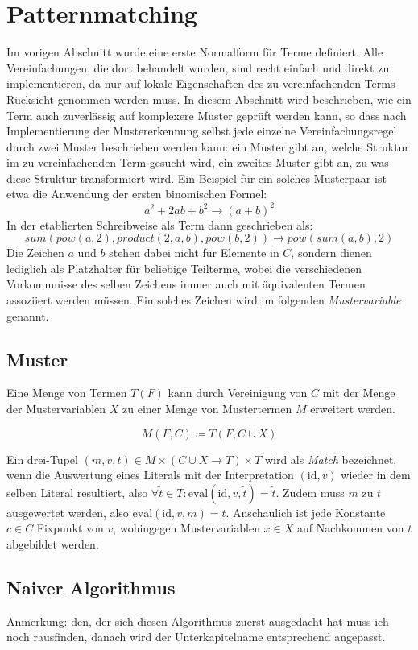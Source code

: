 \documentclass{article}
\begin{document}
\section{Patternmatching}
Im vorigen Abschnitt wurde eine erste Normalform für Terme definiert. Alle Vereinfachungen, die dort behandelt wurden, sind recht einfach und direkt zu implementieren, da nur auf lokale Eigenschaften des zu vereinfachenden Terms Rücksicht genommen werden muss. In diesem Abschnitt wird beschrieben, wie ein Term auch zuverlässig auf komplexere Muster geprüft werden kann, so dass nach Implementierung der Mustererkennung selbst jede einzelne Vereinfachungsregel durch zwei Muster beschrieben werden kann: ein Muster gibt an, welche Struktur im zu vereinfachenden Term gesucht wird, ein zweites Muster gibt an, zu was diese Struktur transformiert wird. Ein Beispiel für ein solches Musterpaar ist etwa die Anwendung der ersten binomischen Formel:
$$a^2 + 2 a b + b^2 \rightarrow (a + b)^2$$
In der etablierten Schreibweise als Term dann geschrieben als:
$$sum(pow(a, 2), product(2, a, b), pow(b, 2)) \rightarrow pow(sum(a, b), 2)$$
Die Zeichen $a$ und $b$ stehen dabei nicht für Elemente in $C$, sondern dienen lediglich als Platzhalter für beliebige Teilterme, wobei die verschiedenen Vorkommnisse des selben Zeichens immer auch mit äquivalenten Termen assoziiert werden müssen. Ein solches Zeichen wird im folgenden \textit{Mustervariable} genannt.

\subsection{Muster}
Eine Menge von Termen $T(F)$ kann durch Vereinigung von $C$ mit der Menge der Mustervariablen $X$ zu einer Menge von Mustertermen $M$ erweitert werden. 

$$M(F, C) \coloneqq T(F, C \cup X)$$

Ein drei-Tupel $(m, v, t) \in M \times (C \cup X \rightarrow T) \times T$ wird als \textit{Match} bezeichnet, wenn die Auswertung eines Literals mit der Interpretation $(\mathrm{id}, v)$ wieder in dem selben Literal resultiert, also $ \forall \tilde{t} \in T \colon \mathrm{eval}(\mathrm{id}, v, \tilde{t}) =\tilde{t}$. Zudem muss $m$ zu $t$ ausgewertet werden, also $\mathrm{eval}(\mathrm{id}, v, m) = t$. Anschaulich ist jede Konstante $c \in C$ Fixpunkt von $v$, wohingegen Mustervariablen $x \in X$ auf Nachkommen von $t$ abgebildet werden.

\subsection{Naiver Algorithmus}
\begin{itshape}
Anmerkung: den, der sich diesen Algorithmus zuerst ausgedacht hat muss ich noch rausfinden, danach wird der Unterkapitelname entsprechend angepasst.
\end{itshape}
\end{document}
